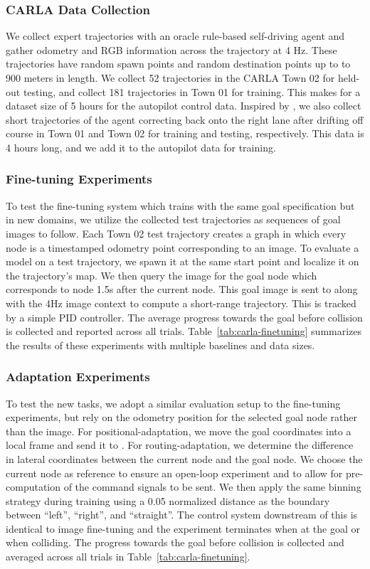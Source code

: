 \subsubsection{CARLA Data Collection} 
We collect expert trajectories with an oracle rule-based self-driving agent and gather odometry and RGB information across the trajectory at 4 Hz. These trajectories have random spawn points and random destination points up to to 900 meters in length. We collect 52 trajectories in the CARLA Town 02 for held-out testing, and collect 181 trajectories in Town 01 for training. This makes for a dataset size of 5 hours for the autopilot control data. Inspired by \cite{Codevilla2017CIL}, we also collect short trajectories of the agent correcting back onto the right lane after drifting off course in Town 01 and Town 02 for training and testing, respectively. This data is 4 hours long, and we add it to the autopilot data for training.

\subsubsection{Fine-tuning Experiments} 

To test the fine-tuning system which trains \ModelName with the same goal specification but in new domains, we utilize the collected test trajectories as sequences of goal images to follow. Each Town 02 test trajectory creates a graph in which every node is a timestamped odometry point corresponding to an image. To evaluate a model on a test trajectory, we spawn it at the same start point and localize it on the trajectory's map. We then query the image for the goal node which corresponds to node 1.5s after the current node. This goal image is sent to \ModelName along with the 4Hz image context  to compute a short-range trajectory. This is tracked by a simple PID controller. The average progress towards the goal before collision is collected and reported across all trials. Table~\ref{tab:carla-finetuning} summarizes the results of these experiments with multiple baselines and data sizes.

\subsubsection{Adaptation Experiments} 

To test the new tasks, we adopt a similar evaluation setup to the fine-tuning experiments, but rely on the odometry position for the selected goal node rather than the image. For positional-adaptation, we move the goal coordinates into a local frame and send it to \ModelName. For routing-adaptation, we determine the difference in lateral coordinates between the current node and the goal node. We choose the current node as reference to ensure an open-loop experiment and to allow for pre-computation of the command signals to be sent. We then apply the same binning strategy during training using a 0.05 normalized distance as the boundary between ``left'', ``right'', and ``straight''. The control system downstream of this is identical to image fine-tuning and the experiment terminates when at the goal or when colliding. The progress towards the goal before collision is collected and averaged across all trials in Table~\ref{tab:carla-finetuning}.


